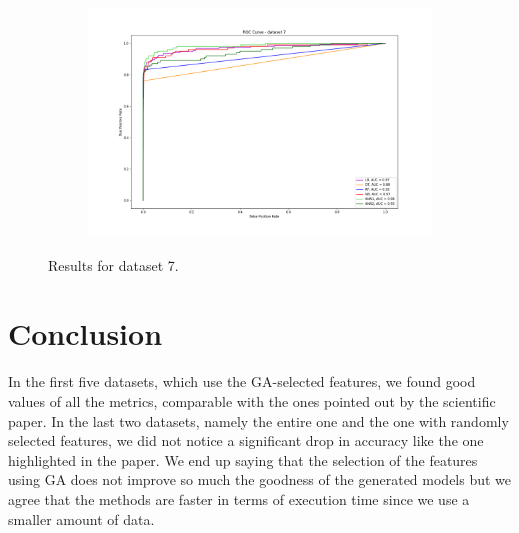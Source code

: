\documentclass{Configuration_Files/PoliMi3i_thesis}
\begin{document}
\begin{figure}[H]
\begin{subfigure}
    \centering
    \includegraphics[scale=0.3]{Images/ROC_7.png}
\end{subfigure}
  \caption{Results for dataset 7.}
\end{figure}



\chapter{Conclusion}
In the first five datasets, which use the GA-selected features, we found good values of all the metrics, comparable with the ones pointed out by the scientific paper.
In the last two datasets, namely the entire one and the one with randomly selected features, we did not notice a significant drop in accuracy like the one highlighted in the paper.
We end up saying that the selection of the features using GA does not improve so much the goodness of the generated models but we agree that the methods are faster in terms of execution time since we use a smaller amount of data.
\end{document}
